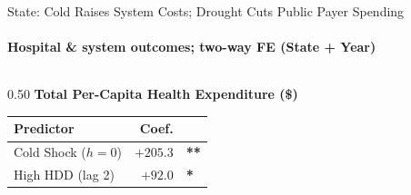 \documentclass[aspectratio=169,11pt]{beamer}
\newcommand{\emphcolor}[1]{{\color{WarmOrange}\textbf{#1}}}
\newcommand{\tealtext}[1]{{\color{Teal}#1}}
\begin{document}
\begin{frame}{State: Cold Raises System Costs; Drought Cuts Public Payer Spending}
  \framesubtitle{Hospital \& system outcomes; two-way FE (State + Year)}
  \scriptsize
  \begin{columns}[T]
    \begin{column}{0.50\textwidth}
      \tealtext{\textbf{Total Per-Capita Health Expenditure (\$)}}\\[0.25em]
      \begin{tabular}{lrl}
        \toprule
        Predictor & Coef. & \\
        \midrule
        Cold Shock ($h{=}0$)   & $+205.3$ & \emphcolor{**} \\
        High HDD (lag 2)       & $+92.0$  & \emphcolor{*}  \\
        \bottomrule
      \end{tabular}
      \vspace{0.45em}


\end{column}
\end{columns}
\end{frame}
\end{document}
